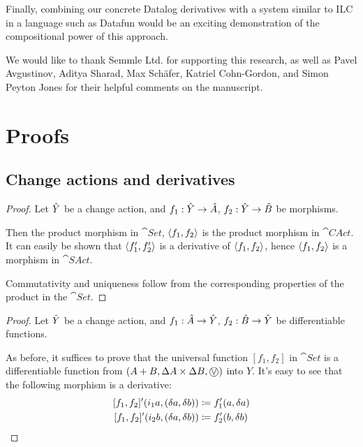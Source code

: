 Finally, combining our concrete Datalog derivatives with a system similar to ILC
in a language such as Datafun would be an exciting demonstration of the compositional
power of this approach.

\begin{acks}

We would like to thank Semmle Ltd. for supporting this research, as well as Pavel
Avgustinov, Aditya Sharad, Max Sch\"afer, Katriel Cohn-Gordon, and Simon Peyton Jones for their
helpful comments on the manuscript.

\end{acks}

\printbibliography

\clearpage
\appendix
\appendixpage
\section{Proofs}

\subsection{Change actions and derivatives}

\products*
\begin{proof}
  \label{prf:products}
  Let $\hat{Y}$ be a change action, and $f_1: \hat{Y} \rightarrow \hat{A}$, $f_2: \hat{Y}
  \rightarrow \hat{B}$ be morphisms.

  Then the product morphism in $\cat{Set}$, $\left\langle {f_1}, {f_2} \right\rangle$ is the product
  morphism in $\cat{CAct}$. It can easily be
  shown that $\left\langle {f_1'}, {f_2'} \right\rangle$ is a derivative of $\left\langle {f_1}, {f_2} \right\rangle$,
  hence $\left\langle {f_1}, {f_2} \right\rangle$ is a morphism in $\cat{SAct}$.

  Commutativity and uniqueness follow from the corresponding properties of the
  product in the $\cat{Set}$.
\end{proof}

\coproducts*
\begin{proof}
  \label{prf:coproducts}
  Let $\hat{Y}$ be a change action, and $f_1 : \hat{A} \rightarrow \hat{Y}$, $f_2 : \hat{B}
  \rightarrow \hat{Y}$ be differentiable functions.

  As before, it suffices to prove that the universal function $[f_1, f_2]$ in $\cat{Set}$ is a differentiable
  function from $\cstruct{A + B}{\changes{A} \times \changes{B}}{\cplusvee}$ into $Y$. It's easy to see
  that the following morphism is a derivative:
  \begin{align*}
    \derive{[f_1, f_2]} (i_1 a, (\change{a}, \change{b})) &\defeq f_1'(a, \change{a})\\
    \derive{[f_1, f_2]} (i_2 b, (\change{a}, \change{b})) &\defeq f_2'(b, \change{b})
  \end{align*}
\end{proof}

